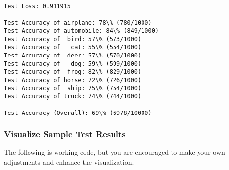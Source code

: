 \documentclass[11pt]{article}
\begin{document}
    \begin{Verbatim}[commandchars=\\\{\}]
Test Loss: 0.911915

Test Accuracy of airplane: 78\% (780/1000)
Test Accuracy of automobile: 84\% (849/1000)
Test Accuracy of  bird: 57\% (573/1000)
Test Accuracy of   cat: 55\% (554/1000)
Test Accuracy of  deer: 57\% (570/1000)
Test Accuracy of   dog: 59\% (599/1000)
Test Accuracy of  frog: 82\% (829/1000)
Test Accuracy of horse: 72\% (726/1000)
Test Accuracy of  ship: 75\% (754/1000)
Test Accuracy of truck: 74\% (744/1000)

Test Accuracy (Overall): 69\% (6978/10000)
    \end{Verbatim}

    \subsubsection{Visualize Sample Test
Results}\label{visualize-sample-test-results}

The following is working code, but you are encouraged to make your own
adjustments and enhance the visualization.
\end{document}

